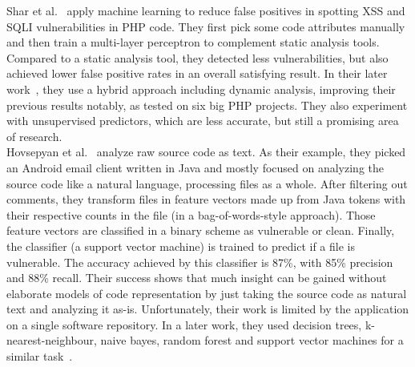 \documentclass[
a4paper,
pagesize,
pdftex,
12pt,
twoside, %
BCOR=5mm, %
ngerman,
fleqn,
final,
]{scrartcl}
\begin{document}
	Shar et al.~\cite{Shar.2013b} apply machine learning to reduce false positives in spotting XSS and SQLI vulnerabilities in PHP code. They first pick some code attributes manually and then train a multi-layer perceptron to complement static analysis tools. Compared to a static analysis tool, they detected less vulnerabilities, but also achieved lower false positive rates in an overall satisfying result. In their later work~\cite{Shar.2013}, they use a hybrid approach including dynamic analysis, improving their previous results notably, as tested on six big PHP projects. They also experiment with unsupervised predictors, which are less accurate, but still a promising area of research. \\
	Hovsepyan et al.~\cite{Hovsepyan.2012} analyze raw source code as text. As their example, they picked an Android email client written in Java and mostly focused on analyzing the source code like a natural language, processing files as a whole. After filtering out comments, they transform files in feature vectors made up from Java tokens with their respective counts in the file (in a bag-of-words-style approach). Those feature vectors are classified in a binary scheme as vulnerable or clean. Finally, the classifier (a support vector machine) is trained to predict if a file is vulnerable. The accuracy achieved by this classifier is 87\%, with 85\% precision and 88\% recall. Their success shows that much insight can be gained without elaborate models of code representation by just taking the source code as natural text and analyzing it as-is. Unfortunately, their work is limited by the application on a single software repository. In a later work, they used decision trees, k-nearest-neighbour, naive bayes, random forest and support vector machines for a similar task~\cite{Scandariato.2014}.\\
	
\end{document}
